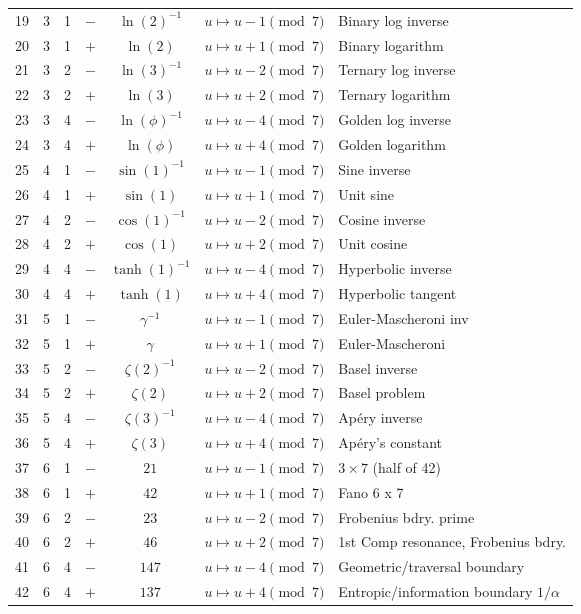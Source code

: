 \documentclass[pdflatex,sn-mathphys-num]{sn-jnl}
\theoremstyle{thmstyleone}
\theoremstyle{thmstyletwo}
\theoremstyle{thmstylethree}
\begin{document}
\begin{longtable}{@{}r c c c c l l@{}}
19 & 3 & 1 & $-$ & \(\ln(2)^{-1}\) & $u \mapsto u - 1 \pmod{7}$ & Binary log inverse \\
20 & 3 & 1 & $+$ & \(\ln(2)\) & $u \mapsto u + 1 \pmod{7}$ & Binary logarithm \\
21 & 3 & 2 & $-$ & \(\ln(3)^{-1}\) & $u \mapsto u - 2 \pmod{7}$ & Ternary log inverse \\
22 & 3 & 2 & $+$ & \(\ln(3)\) & $u \mapsto u + 2 \pmod{7}$ & Ternary logarithm \\
23 & 3 & 4 & $-$ & \(\ln(\phi)^{-1}\) & $u \mapsto u - 4 \pmod{7}$ & Golden log inverse \\
24 & 3 & 4 & $+$ & \(\ln(\phi)\) & $u \mapsto u + 4 \pmod{7}$ & Golden logarithm \\

25 & 4 & 1 & $-$ & \(\sin(1)^{-1}\) & $u \mapsto u - 1 \pmod{7}$ & Sine inverse \\
26 & 4 & 1 & $+$ & \(\sin(1)\) & $u \mapsto u + 1 \pmod{7}$ & Unit sine \\
27 & 4 & 2 & $-$ & \(\cos(1)^{-1}\) & $u \mapsto u - 2 \pmod{7}$ & Cosine inverse \\
28 & 4 & 2 & $+$ & \(\cos(1)\) & $u \mapsto u + 2 \pmod{7}$ & Unit cosine \\
29 & 4 & 4 & $-$ & \(\tanh(1)^{-1}\) & $u \mapsto u - 4 \pmod{7}$ & Hyperbolic inverse \\
30 & 4 & 4 & $+$ & \(\tanh(1)\) & $u \mapsto u + 4 \pmod{7}$ & Hyperbolic tangent \\

31 & 5 & 1 & $-$ & \(\gamma^{-1}\) & $u \mapsto u - 1 \pmod{7}$ & Euler-Mascheroni inv \\
32 & 5 & 1 & $+$ & \(\gamma\) & $u \mapsto u + 1 \pmod{7}$ & Euler-Mascheroni \\
33 & 5 & 2 & $-$ & \(\zeta(2)^{-1}\) & $u \mapsto u - 2 \pmod{7}$ & Basel inverse \\
34 & 5 & 2 & $+$ & \(\zeta(2)\) & $u \mapsto u + 2 \pmod{7}$ & Basel problem \\
35 & 5 & 4 & $-$ & \(\zeta(3)^{-1}\) & $u \mapsto u - 4 \pmod{7}$ & Apéry inverse \\
36 & 5 & 4 & $+$ & \(\zeta(3)\) & $u \mapsto u + 4 \pmod{7}$ & Apéry's constant \\

37 & 6 & 1 & $-$ & \(21\) & $u \mapsto u - 1 \pmod{7}$ & $3 \times 7$ (half of 42) \\
38 & 6 & 1 & $+$ & \(42\) & $u \mapsto u + 1 \pmod{7}$ & Fano 6 x 7 \\
39 & 6 & 2 & $-$ & \(23\) & $u \mapsto u - 2 \pmod{7}$ & Frobenius bdry. prime \\
40 & 6 & 2 & $+$ & \(46\) & $u \mapsto u + 2 \pmod{7}$ & 1st Comp resonance, Frobenius bdry. \\
41 & 6 & 4 & $-$ & \(147\) & $u \mapsto u - 4 \pmod{7}$ & Geometric/traversal boundary \\
42 & 6 & 4 & $+$ & \(137\) & $u \mapsto u + 4 \pmod{7}$ & Entropic/information boundary $1/\alpha$ \\


\end{longtable}
\end{document}
